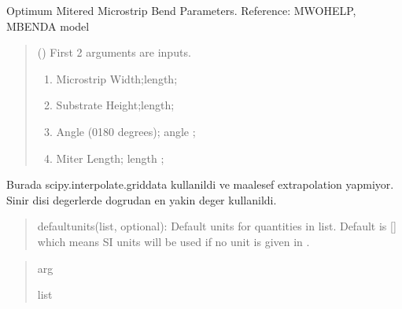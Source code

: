 \documentclass[letterpaper,10pt,english]{sphinxmanual}
\begin{document}

\begin{fulllineitems}
\label{\detokenize{components:components.OptimumMiteredArbitraryAngleMicrostripBend}}
\pysigstartsignatures
{}
\pysigstopsignatures
\sphinxAtStartPar
Optimum Mitered Microstrip Bend Parameters.
Reference: MWOHELP, MBENDA model
\begin{quote}\begin{description}
\sphinxAtStartPar
{} () \textendash{} 
\sphinxAtStartPar
First 2 arguments are inputs.
\begin{enumerate}
%
\item {} 
\sphinxAtStartPar
Microstrip Width;length;

\item {} 
\sphinxAtStartPar
Substrate Height;length;

\item {} 
\sphinxAtStartPar
Angle (0\sphinxhyphen{}180 degrees); angle ;

\item {} 
\sphinxAtStartPar
Miter Length; length ;

\end{enumerate}


\end{description}\end{quote}

\sphinxAtStartPar
Burada scipy.interpolate.griddata kullanildi ve maalesef extrapolation yapmiyor. Sinir disi degerlerde dogrudan en yakin deger kullanildi.
\begin{quote}

\sphinxAtStartPar
defaultunits(list, optional): Default units for quantities in  list. Default is {[}{]} which means SI units will be used if no unit is given in .
\end{quote}
\begin{quote}\begin{description}
\sphinxAtStartPar
arg

\sphinxAtStartPar
list

\end{description}\end{quote}

\end{fulllineitems}
\end{document}
